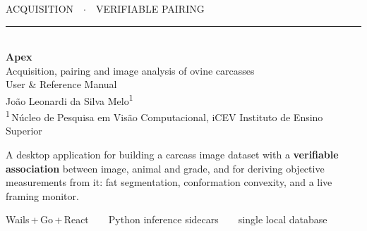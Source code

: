 \documentclass[11pt,a4paper,oneside]{book}
\begin{document}
\frontmatter

\begin{titlepage}
\thispagestyle{empty}
\vspace*{2.2cm}
\begin{flushleft}
{\ttfamily\color{cyandk}\large ACQUISITION\ \ $\cdot$\ \ VERIFIABLE PAIRING}\\[6pt]
{\color{cyan}\rule{\linewidth}{1.2pt}}\\[10pt]
{\sffamily\bfseries\fontsize{52}{56}\selectfont\color{ink}Apex}\\[10pt]
{\sffamily\Large\color{muted}Acquisition, pairing and image analysis of ovine carcasses}\\[4pt]
{\sffamily\large\color{muted}User \& Reference Manual}\\[22pt]
{\sffamily\large\color{ink}João Leonardi da Silva Melo\textsuperscript{1}}\\[3pt]
{\sffamily\small\color{muted}\textsuperscript{1}\,Núcleo de Pesquisa em Visão Computacional, iCEV Instituto de Ensino Superior}
\end{flushleft}

\vfill

\begin{tcolorbox}[colback=codebg,colframe=hair,boxrule=0.6pt,arc=2pt]
\small\sffamily
A desktop application for building a carcass image dataset with a
\textbf{verifiable association} between image, animal and grade, and for deriving
objective measurements from it: fat segmentation, conformation convexity, and a
live framing monitor.
\end{tcolorbox}

\vspace{0.6cm}
{\ttfamily\small\color{muted}
Wails\,+\,Go\,+\,React\ \ \textbullet\ \ Python inference sidecars\ \ \textbullet\ \ single local database\par}
\end{titlepage}

\tableofcontents

\mainmatter















\end{document}
